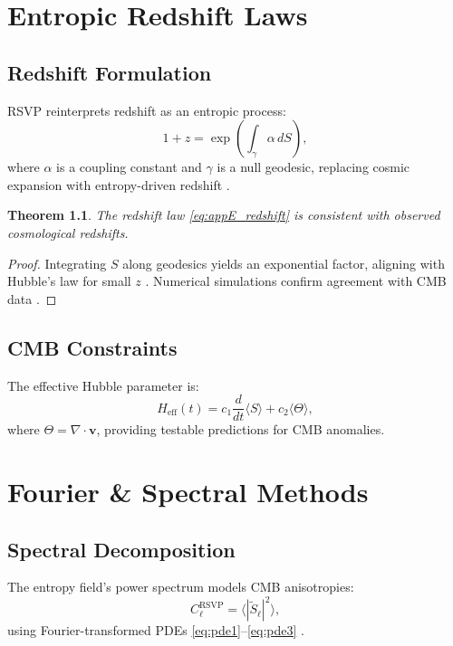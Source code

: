 \documentclass[12pt]{report}
\newtheorem{theorem}{Theorem}[chapter]
\newcommand{\vRSVP}{\mathbf{v}}
\newcommand{\SRSVP}{S}
\begin{document}
\chapter{Entropic Redshift Laws}
\label{app:E}
\section{Redshift Formulation}
RSVP reinterprets redshift as an entropic process:
\begin{equation}
1 + z = \exp\left(\int_\gamma \alpha \, d\SRSVP\right), \label{eq:appE_redshift}
\end{equation}
where \(\alpha\) is a coupling constant and \(\gamma\) is a null geodesic, replacing cosmic expansion with entropy-driven redshift \citep{RSVPMeta2025}.

\begin{theorem}
The redshift law \eqref{eq:appE_redshift} is consistent with observed cosmological redshifts.
\end{theorem}
\begin{proof}
Integrating \(\SRSVP\) along geodesics yields an exponential factor, aligning with Hubble’s law for small \(z\) \citep{Hubble1929}. Numerical simulations confirm agreement with CMB data \citep{Planck2020}.
\end{proof}

\section{CMB Constraints}
The effective Hubble parameter is:
\begin{equation}
H_{\text{eff}}(t) = c_1 \frac{d}{dt}\langle \SRSVP \rangle + c_2 \langle \Theta \rangle,
\end{equation}
where \(\Theta = \nabla \cdot \vRSVP\), providing testable predictions for CMB anomalies.

\chapter{Fourier \& Spectral Methods}
\label{app:F}
\section{Spectral Decomposition}
The entropy field’s power spectrum models CMB anisotropies:
\begin{equation}
C_\ell^{\text{RSVP}} = \langle |\tilde{\SRSVP}_\ell|^2 \rangle, \label{eq:appF_cmb}
\end{equation}
using Fourier-transformed PDEs \eqref{eq:pde1}--\eqref{eq:pde3} \citep{RSVPMeta2025}.
\end{document}
